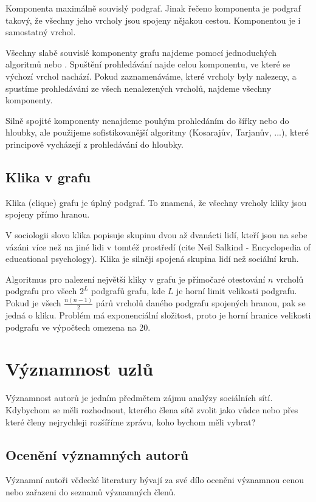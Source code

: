 \documentclass{bakalarka}
\begin{document}
Komponenta maximálně souvislý podgraf. Jinak řečeno komponenta je podgraf
takový, že všechny jeho vrcholy jsou spojeny nějakou cestou. Komponentou je i
samostatný vrchol.

Všechny slabě souvislé komponenty grafu najdeme pomocí jednoduchých algoritmů
 nebo . Spuštění prohledávání najde
celou komponentu, ve které se výchozí vrchol nachází. Pokud zaznamenáváme,
které vrcholy byly nalezeny, a spustíme prohledávání ze všech nenalezených
vrcholů, najdeme všechny komponenty. 

Silně spojité komponenty nenajdeme pouhým prohledáním do šířky nebo do hloubky,
ale použijeme sofistikovanější algoritmy (Kosarajův, Tarjanův, ...), které
principově vycházejí z prohledávání do hloubky.

\subsection{Klika v grafu}
Klika (clique) grafu je úplný podgraf. To znamená, že všechny vrcholy kliky
jsou spojeny přímo hranou.

V sociologii slovo klika popisuje skupinu dvou až dvanácti lidí, kteří jsou na
sebe vázáni více než na jiné lidi v tomtéž prostředí (cite Neil Salkind -
Encyclopedia of educational psychology). Klika je silněji spojená skupina lidí
než sociální kruh.

Algoritmus pro nalezení největší kliky v grafu je přímočaré otestování $n$
vrcholů podgrafu pro všech $2^L$ podgrafů grafu, kde $L$ je horní limit
velikosti podgrafu. Pokud je všech $\frac{n(n - 1)}{2}$ párů vrcholů daného
podgrafu spojených hranou, pak se jedná o kliku. Problém má exponenciální
složitost, proto je horní hranice velikosti podgrafu ve výpočtech omezena na
20.

\section{Významnost uzlů}
Významnost autorů je jedním předmětem zájmu analýzy sociálních sítí. Kdybychom
se měli rozhodnout, kterého člena sítě zvolit jako vůdce nebo přes které členy
nejrychleji rozšíříme zprávu, koho bychom měli vybrat? 

\subsection{Ocenění významných autorů}
Významní autoři vědecké literatury bývají za své dílo oceněni významnou cenou
nebo zařazeni do seznamů významných členů.
\end{document}
